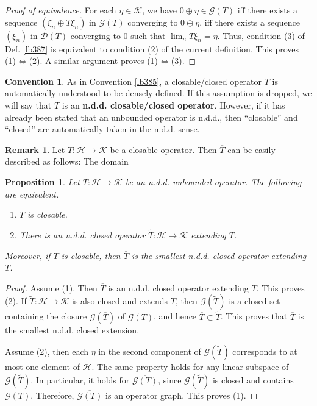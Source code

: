 \documentclass[12pt,b5paper,notitlepage]{article}
\theoremstyle{definition}
\newtheorem{rem}[df]{Remark}
\newtheorem{cv}[df]{Convention}
\theoremstyle{plain}
\newtheorem{pp}[df]{Proposition}
\newcommand{\wtd}{\widetilde}
\newcommand{\ovl}{\overline}
\newcommand{\Dom}{\mathscr{D}}
\newcommand{\MH}{\mathcal H}
\newcommand{\MK}{\mathcal K}
\newcommand{\SG}{\mathscr G}
\numberwithin{equation}{section}
\begin{document}
\begin{proof}[Proof of equivalence]
For each $\eta\in\MK$, we have $0\oplus\eta\in\ovl{\SG(T)}$ iff there exists a sequence $(\xi_n\oplus T\xi_n)$ in $\SG(T)$ converging to $0\oplus\eta$, iff there exists a sequence $(\xi_n)$ in $\Dom(T)$ converging to $0$ such that $\lim_n T\xi_n=\eta$. Thus, condition (3) of Def. \ref{lb387} is equivalent to condition (2) of the current definition. This proves (1)$\Leftrightarrow$(2). A similar argument proves (1)$\Leftrightarrow$(3).
\end{proof}



\begin{cv}
As in Convention \ref{lb385}, a closable/closed operator $T$ is automatically understood to be densely-defined. If this assumption is dropped, we will say that $T$ is an \textbf{n.d.d. closable/closed operator}. However, if it has already been stated that an unbounded operator is n.d.d., then ``closable'' and ``closed'' are automatically taken in the n.d.d. sense.
\end{cv}


\begin{rem}
Let $T:\MH\rightarrow\MK$ be a closable operator. Then $\ovl T$ can be easily described as follows: The domain 
\end{rem}


\begin{pp}
Let $T:\MH\rightarrow\MK$ be an n.d.d. unbounded operator. The following are equivalent.
\begin{enumerate}
\item[(1)] $T$ is closable.
\item[(2)] There is an n.d.d. closed operator $\wtd T:\MH\rightarrow\MK$ extending $T$.
\end{enumerate}
Moreover, if $T$ is closable, then $\ovl T$ is the smallest n.d.d. closed operator extending $T$. 
\end{pp}



\begin{proof}
Assume (1). Then $\ovl T$ is an n.d.d. closed operator extending $T$. This proves (2). If $\wtd T:\MH\rightarrow\MK$ is also closed and extends $T$, then $\SG(\wtd T)$ is a closed set containing the closure $\SG(\ovl T)$ of $\SG(T)$, and hence $\ovl T\subset\wtd T$. This proves that $\ovl T$ is the smallest n.d.d. closed extension.

Assume (2), then each $\eta$ in the second component of $\SG(\wtd T)$ corresponds to at most one element of $\MH$. The same property holds for any linear subspace of $\SG(\wtd T)$. In particular, it holds for $\ovl{\SG(T)}$, since $\SG(\wtd T)$ is closed and contains $\SG(T)$. Therefore, $\ovl{\SG(T)}$ is an operator graph. This proves (1).
\end{proof}
\end{document}
